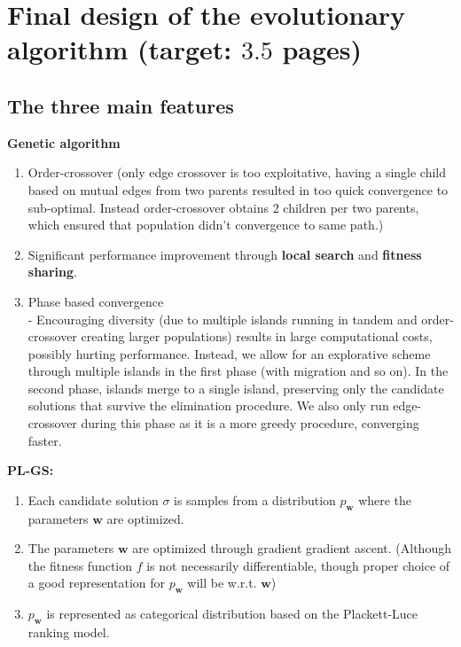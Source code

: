 \documentclass[a4paper,10pt]{article}
\def\retake{0}
\newcommand{\switch}[2]{\ifnum\retake=0{#1}\else{#2}\fi}
\newcommand{\ReplaceMe}[1]{{\color{blue}#1}}
\newcommand{\RemoveMe}[1]{{\color{purple}#1}}
\begin{document}
\section{Final design of the evolutionary algorithm (target: $3.5$ pages)} 


\subsection{The three main features}
	
	
	\textbf{Genetic algorithm}
		\begin{enumerate}
		\item Order-crossover (only edge crossover is too exploitative, having a single child based on mutual edges from two parents resulted in too quick convergence to sub-optimal. Instead order-crossover obtains 2 children per two parents, which ensured that population didn't convergence to same path.)
		\item Significant performance improvement through \textbf{local search} and \textbf{fitness sharing}.
		\item Phase based convergence \\
			- Encouraging diversity (due to multiple islands running in tandem and order-crossover creating larger populations) results in large computational costs, possibly hurting performance. Instead, we allow for an explorative scheme through multiple islands in the first phase (with migration and so on). In the second phase, islands merge to a single island, preserving only the candidate solutions that survive the elimination procedure. We also only run edge-crossover during this phase as it is a more greedy procedure, converging faster.
		\end{enumerate}
	
	
	\textbf{PL-GS:}
		\begin{enumerate}
		 \item Each candidate solution $\sigma$ is samples from a distribution $p_\mathbf{w}$ where the parameters $\mathbf{w}$ are optimized.
		 \item The parameters $\mathbf{w}$ are optimized through gradient gradient ascent. (Although the fitness function $f$ is not necessarily differentiable, though proper choice of a good representation for $p_\mathbf{w}$ will be w.r.t. $\mathbf{w}$)
		 \item $p_\mathbf{w}$ is represented as categorical distribution based on the Plackett-Luce ranking model.
		\end{enumerate}
\end{document}
